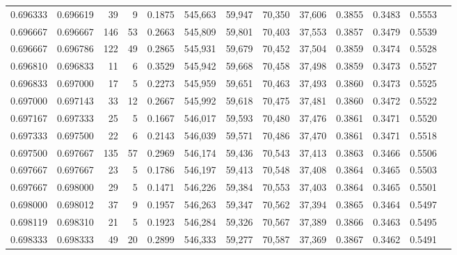\begin{tabular}{rrrrrrrrrrrrr}
0.696333 & 0.696619 &    39 &   9 &                                     0.1875 & 545,663 &  59,947 &  70,350 &  37,606 & 0.3855 & 0.3483 & 0.5553 \\
0.696667 & 0.696667 &   146 &  53 &                                     0.2663 & 545,809 &  59,801 &  70,403 &  37,553 & 0.3857 & 0.3479 & 0.5539 \\
0.696667 & 0.696786 &   122 &  49 &                                     0.2865 & 545,931 &  59,679 &  70,452 &  37,504 & 0.3859 & 0.3474 & 0.5528 \\
0.696810 & 0.696833 &    11 &   6 &                                     0.3529 & 545,942 &  59,668 &  70,458 &  37,498 & 0.3859 & 0.3473 & 0.5527 \\
0.696833 & 0.697000 &    17 &   5 &                                     0.2273 & 545,959 &  59,651 &  70,463 &  37,493 & 0.3860 & 0.3473 & 0.5525 \\
0.697000 & 0.697143 &    33 &  12 &                                     0.2667 & 545,992 &  59,618 &  70,475 &  37,481 & 0.3860 & 0.3472 & 0.5522 \\
0.697167 & 0.697333 &    25 &   5 &                                     0.1667 & 546,017 &  59,593 &  70,480 &  37,476 & 0.3861 & 0.3471 & 0.5520 \\
0.697333 & 0.697500 &    22 &   6 &                                     0.2143 & 546,039 &  59,571 &  70,486 &  37,470 & 0.3861 & 0.3471 & 0.5518 \\
0.697500 & 0.697667 &   135 &  57 &                                     0.2969 & 546,174 &  59,436 &  70,543 &  37,413 & 0.3863 & 0.3466 & 0.5506 \\
0.697667 & 0.697667 &    23 &   5 &                                     0.1786 & 546,197 &  59,413 &  70,548 &  37,408 & 0.3864 & 0.3465 & 0.5503 \\
0.697667 & 0.698000 &    29 &   5 &                                     0.1471 & 546,226 &  59,384 &  70,553 &  37,403 & 0.3864 & 0.3465 & 0.5501 \\
0.698000 & 0.698012 &    37 &   9 &                                     0.1957 & 546,263 &  59,347 &  70,562 &  37,394 & 0.3865 & 0.3464 & 0.5497 \\
0.698119 & 0.698310 &    21 &   5 &                                     0.1923 & 546,284 &  59,326 &  70,567 &  37,389 & 0.3866 & 0.3463 & 0.5495 \\
0.698333 & 0.698333 &    49 &  20 &                                     0.2899 & 546,333 &  59,277 &  70,587 &  37,369 & 0.3867 & 0.3462 & 0.5491 \\

\end{tabular}
